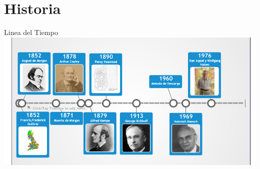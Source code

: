 \documentclass[spanish,utf8]{beamer}
\begin{document}
\section{Historia}

\begin{frame}{Linea del Tiempo}
\includegraphics[scale=0.35]{linea.png}    
\end{frame}

\end{document}
